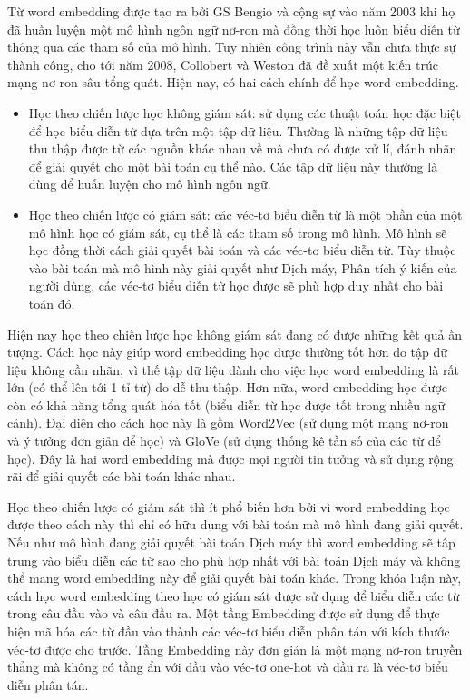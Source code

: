 Từ word embedding được tạo ra bởi GS Bengio và cộng sự vào năm 2003 \cite{bengioLM2003} khi họ đã huấn luyện một mô hình ngôn ngữ nơ-ron mà đồng thời học luôn biểu diễn từ thông qua các tham số của mô hình. Tuy nhiên công trình này vẫn chưa thực sự thành công, cho tới năm 2008, Collobert và Weston \cite{wordembeddingCollobert2008} đã đề xuất một kiến trúc mạng nơ-ron sâu tổng quát. 
Hiện nay, có hai cách chính để học word embedding.
\begin{itemize}
	\item Học theo chiến lược học không giám sát: sử dụng các thuật toán học đặc biệt để học biểu diễn từ dựa trên một tập dữ liệu. Thường là những tập dữ liệu thu thập được từ các nguồn khác nhau về mà chưa có được xử lí, đánh nhãn để giải quyết cho một bài toán cụ thể nào. Các tập dữ liệu này thường là dùng để huấn luyện cho mô hình ngôn ngữ.
	\item Học theo chiến lược có giám sát: các véc-tơ biểu diễn từ là một phần của một mô hình học có giám sát, cụ thể là các tham số trong mô hình. Mô hình sẽ học đồng thời cách giải quyết bài toán và các véc-tơ biểu diễn từ. Tùy thuộc vào bài toán mà mô hình này giải quyết như Dịch máy, Phân tích ý kiến của người dùng, các véc-tơ biểu diễn từ học được sẽ phù hợp duy nhất cho bài toán đó.
\end{itemize}

Hiện nay học theo chiến lược học không giám sát đang có được những kết quả ấn tượng. Cách học này giúp word embedding học được thường tốt hơn do tập dữ liệu không cần nhãn, vì thế tập dữ liệu dành cho việc học word embedding là rất lớn (có thể lên tới 1 tỉ từ) do dễ thu thập. Hơn nữa, word embedding học được còn có khả năng tổng quát hóa tốt (biểu diễn từ học được tốt trong nhiều ngữ cảnh). Đại diện cho cách học này là gồm Word2Vec \cite{word2vec2013} (sử dụng một mạng nơ-ron và ý tưởng đơn giản để học) và GloVe \cite{glove2014} (sử dụng thống kê tần số của các từ để học). Đây là hai word embedding mà được mọi người tin tưởng và sử dụng rộng rãi để giải quyết các bài toán khác nhau.

Học theo chiến lược có giám sát thì ít phổ biến hơn bởi vì word embedding học được theo cách này thì chỉ có hữu dụng với bài toán mà mô hình đang giải quyết. Nếu như mô hình đang giải quyết bài toán Dịch máy thì word embedding sẽ tâp trung vào biểu diễn các từ sao cho phù hợp nhất với bài toán Dịch máy và không thể mang word embedding này để giải quyết bài toán khác. Trong khóa luận này, cách học word embedding theo học có giám sát được sử dụng để biểu diễn các từ trong câu đầu vào và câu đầu ra. Một tầng Embedding được sử dụng để thực hiện mã hóa các từ đầu vào thành các véc-tơ biểu diễn phân tán với kích thước véc-tơ được cho trước. Tầng Embedding này đơn giản là một mạng nơ-ron truyền thẳng mà không có tầng ẩn với đầu vào véc-tơ one-hot và đầu ra là véc-tơ biểu diễn phân tán.

